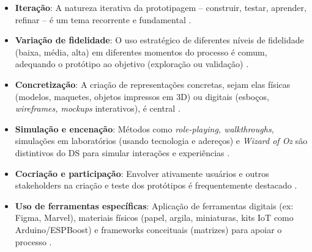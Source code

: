 \begin{itemize}
	\item \textbf{Iteração}: A natureza iterativa da prototipagem – construir, testar, aprender, refinar – é um tema recorrente e fundamental \cite{hegemann2024palette, quintero2021interdisciplinary, mager2023product, paust2025integrative, you2022applying, asbjornsen2022echange, kumar2023rheumatology, villa2022integratedcare, Suryawati2024, Kim2024}.
	
	\item \textbf{Variação de fidelidade}: O uso estratégico de diferentes níveis de fidelidade (baixa, média, alta) em diferentes momentos do processo é comum, adequando o protótipo ao objetivo (exploração ou validação) \cite{mager2023product, Vieira2025, asbjornsen2022echange, kumar2023rheumatology, wang2023smartproducts, villa2022integratedcare}.
	
	\item \textbf{Concretização}: A criação de representações concretas, sejam elas físicas (modelos, maquetes, objetos impressos em 3D) ou digitais (esboços, \textit{wireframes, mockups} interativos), é central \cite{paust2025integrative, quintero2021interdisciplinary, nguyen2022human, lee2023industry, asbjornsen2022echange, villa2022integratedcare}.
	
	\item \textbf{Simulação e encenação}: Métodos como \textit{role-playing, walkthroughs}, simulações em laboratórios (usando tecnologia e adereços) e \textit{Wizard of Oz} são distintivos do DS para simular interações e experiências \cite{soto2023prototyping, lee2022how, mager2023product, seko2024transitions, yan2022pssvalue, Kim2024}.
	
	\item \textbf{Cocriação e participação}: Envolver ativamente usuários e outros stakeholders na criação e teste dos protótipos é frequentemente destacado \cite{asbjornsen2022echange, dehmel2021weather, kumar2023rheumatology, lambe2022capabilities, milton2021eatingdisorders, seko2024transitions, soto2023prototyping}.
	
	\item \textbf{Uso de ferramentas específicas}: Aplicação de ferramentas digitais (ex: Figma, Marvel), materiais físicos (papel, argila, miniaturas, kits IoT como Arduino/ESPBoost) e frameworks conceituais (matrizes) para apoiar o processo \cite{villa2022integratedcare, asbjornsen2022echange, quintero2021interdisciplinary, soto2023prototyping, Kim2024, lee2023industry, yan2022pssvalue}.
\end{itemize}

